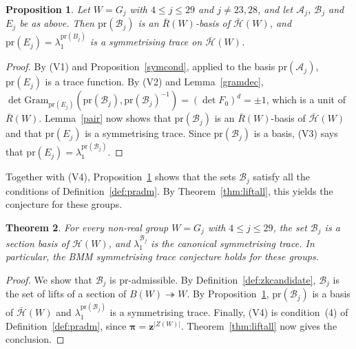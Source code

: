 \documentclass[11pt, reqno]{amsart}
\newcommand{\gram}{\mathrm{Gram}}
\newcommand{\cA}{\mathcal{A}}
\newcommand{\cB}{\mathcal{B}}
\newcommand{\cH}{\mathcal{H}}
\numberwithin{equation}{section}
\newtheorem{theorem}{Theorem}[section]
\newtheorem{proposition}[theorem]{Proposition}
\theoremstyle{remark}
\begin{document}
\begin{proposition}\label{barconj}
Let $W=G_j$ with $4\le j\le 29$ and $j\neq 23,28$, and let $\cA_j$,
$\cB_j$ and $E_j$ be as above. Then $\mathrm{pr}(\cB_j)$ is an
$\bar R(W)$-basis of $\bar{\mathcal H}(W)$, and
$\mathrm{pr}(E_j)=\lambda_1^{\mathrm{pr}(B_j)}$ is a symmetrising trace
on $\bar{\mathcal H}(W)$.
\end{proposition}



\begin{proof}
		By (V1) and Proposition~\ref{symcond}, applied to the basis $\mathrm{pr}(\cA_j)$, $\mathrm{pr}(E_j)$ is a trace function. By (V2) and Lemma~\ref{gramdec},
	$\det\gram_{\mathrm{pr}(E_j)}(\mathrm{pr}(\cB_j),\mathrm{pr}(\cB_j)^{-1})=(\det F_0)^d=\pm1$, which is a unit of $\bar R(W)$. Lemma~\ref{pair}
	now shows that $\mathrm{pr}(\cB_j)$ is an $\bar R(W)$-basis of $\bar{\cH}(W)$ and that $\mathrm{pr}(E_j)$ is a
	symmetrising trace. Since $\mathrm{pr}(\cB_j)$ is a basis, (V3) says that $\mathrm{pr}(E_j)=\lambda_1^{\mathrm{pr}(\cB_j)}$.
	\end{proof}
	
	Together with (V4), Proposition~\ref{barconj} shows that the sets
$\mathcal B_j$ satisfy all the conditions of
Definition~\ref{def:pradm}. By Theorem~\ref{thm:liftall}, this yields
the conjecture for these groups.
	
\begin{theorem}\label{thm:Gj}
For every non-real group $W=G_j$ with $4\le j\le 29$, the set
$\mathcal B_j$ is a section basis of $\mathcal H(W)$, and
$\lambda_1^{\mathcal B_j}$ is the canonical symmetrising trace. In
particular, the BMM symmetrising trace conjecture holds for these
groups.
\end{theorem}

\begin{proof}
We show that $\mathcal B_j$ is $\mathrm{pr}$-admissible. By
Definition~\ref{def:zkcandidate}, $\mathcal B_j$ is the set of lifts of
a section of $B(W)\twoheadrightarrow W$. By
Proposition~\ref{barconj}, $\mathrm{pr}(\mathcal B_j)$ is a basis of
$\bar{\mathcal H}(W)$ and $\lambda_1^{\mathrm{pr}(\mathcal B_j)}$ is a
symmetrising trace. Finally, (V4) is condition~(4) of
Definition~\ref{def:pradm}, since $\boldsymbol\pi=\mathbf z^{|Z(W)|}$.
Theorem~\ref{thm:liftall} now gives the conclusion.
\end{proof}
\end{document}
